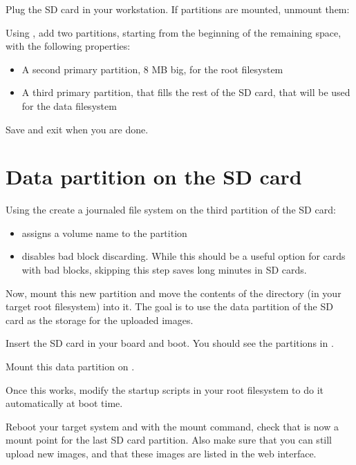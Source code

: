 Plug the SD card in your workstation. If partitions are mounted,
unmount them:


Using , add two partitions, starting from the beginning
of the remaining space, with the following properties:

\begin{itemize}
\item A second primary partition, 8 MB big, for the root filesystem
\item A third primary partition, that fills the rest of the SD card, that will be
  used for the data filesystem
\end{itemize}

Save and exit when you are done.

\section{Data partition on the SD card}

Using the  create a journaled file system on the
third partition of the SD card:


\begin{itemize}
\item {} assigns a volume name to the partition
\item {} disables bad block discarding. While this
      should be a useful option for cards with bad blocks, skipping
      this step saves long minutes in SD cards.
\end{itemize}

Now, mount this new partition and move the contents of the
 directory (in your target root filesystem) into
it. The goal is to use the data partition of the SD card as the storage
for the uploaded images.

Insert the SD card in your board and boot. You should see the
partitions in .

Mount this data partition on .

Once this works, modify the startup scripts in your root filesystem
to do it automatically at boot time.

Reboot your target system and with the mount command, check that
 is now a mount point for the last SD card
partition. Also make sure that you can still upload new images, and
that these images are listed in the web interface.

